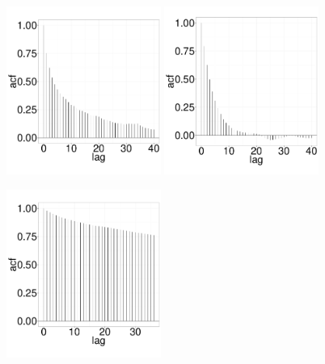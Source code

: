 {  \begin{figure}[H]
  \centering
  \begin{minipage}[!hp]{0.99\linewidth}
  \centering
  \begin{minipage}[!hp]{0.99\linewidth}
    \includegraphics [width=0.45\textwidth, angle=0]{figs/EXP_ks/exp_gbsacf_7_05_3_.pdf}
    \includegraphics [width=0.45\textwidth, angle=0]{figs/EXP_ks/exp_mhacf_7_05_3_.pdf}
  \end{minipage}
	\centering
  \begin{minipage}[!hp]{0.99\linewidth}
    \includegraphics [width=0.45\textwidth, angle=0]{figs/EXP_ks/exp_gbsacf_44_05_10_.pdf}

\end{minipage}
\end{minipage}
\end{figure}}
